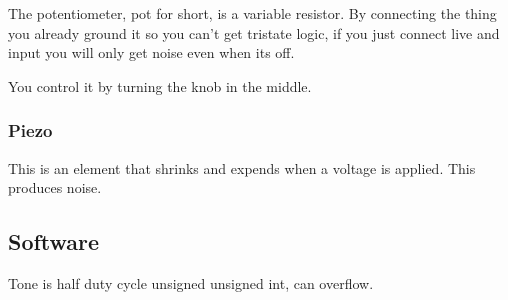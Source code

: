 The potentiometer, 
pot for short,
is a variable resistor.
By connecting the thing you already ground it
so you can't get tristate logic,
if you just connect live and input you will only get noise even when its off.

You control it by turning the knob in the middle.

\subsubsection{Piezo}

This is an element that shrinks and expends when a voltage is applied.
This produces noise.

\subsection{Software}


Tone is half duty cycle unsigned unsigned int,
can overflow.


